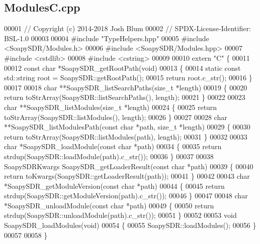 \subsection{Modules\+C.\+cpp}
\label{ModulesC_8cpp_source}

\begin{DoxyCode}
00001 \textcolor{comment}{// Copyright (c) 2014-2018 Josh Blum}
00002 \textcolor{comment}{// SPDX-License-Identifier: BSL-1.0}
00003 
00004 \textcolor{preprocessor}{#include "TypeHelpers.hpp"}
00005 \textcolor{preprocessor}{#include <SoapySDR/Modules.h>}
00006 \textcolor{preprocessor}{#include <SoapySDR/Modules.hpp>}
00007 \textcolor{preprocessor}{#include <cstdlib>}
00008 \textcolor{preprocessor}{#include <cstring>}
00009 
00010 \textcolor{keyword}{extern} \textcolor{stringliteral}{"C"} \{
00011 
00012 \textcolor{keyword}{const} \textcolor{keywordtype}{char} *SoapySDR_getRootPath(\textcolor{keywordtype}{void})
00013 \{
00014     \textcolor{keyword}{static} \textcolor{keyword}{const} std::string root = SoapySDR::getRootPath();
00015     \textcolor{keywordflow}{return} root.c\_str();
00016 \}
00017 
00018 \textcolor{keywordtype}{char} **SoapySDR_listSearchPaths(\textcolor{keywordtype}{size\_t} *length)
00019 \{
00020     \textcolor{keywordflow}{return} toStrArray(SoapySDR::listSearchPaths(), length);
00021 \}
00022 
00023 \textcolor{keywordtype}{char} **SoapySDR_listModules(\textcolor{keywordtype}{size\_t} *length)
00024 \{
00025     \textcolor{keywordflow}{return} toStrArray(SoapySDR::listModules(), length);
00026 \}
00027 
00028 \textcolor{keywordtype}{char} **SoapySDR_listModulesPath(\textcolor{keyword}{const} \textcolor{keywordtype}{char} *path, \textcolor{keywordtype}{size\_t} *length)
00029 \{
00030     \textcolor{keywordflow}{return} toStrArray(SoapySDR::listModules(path), length);
00031 \}
00032 
00033 \textcolor{keywordtype}{char} *SoapySDR_loadModule(\textcolor{keyword}{const} \textcolor{keywordtype}{char} *path)
00034 \{
00035     \textcolor{keywordflow}{return} strdup(SoapySDR::loadModule(path).c\_str());
00036 \}
00037 
00038 SoapySDRKwargs SoapySDR_getLoaderResult(\textcolor{keyword}{const} \textcolor{keywordtype}{char} *path)
00039 \{
00040     \textcolor{keywordflow}{return} toKwargs(SoapySDR::getLoaderResult(path));
00041 \}
00042 
00043 \textcolor{keywordtype}{char} *SoapySDR_getModuleVersion(\textcolor{keyword}{const} \textcolor{keywordtype}{char} *path)
00044 \{
00045     \textcolor{keywordflow}{return} strdup(SoapySDR::getModuleVersion(path).c\_str());
00046 \}
00047 
00048 \textcolor{keywordtype}{char} *SoapySDR_unloadModule(\textcolor{keyword}{const} \textcolor{keywordtype}{char} *path)
00049 \{
00050     \textcolor{keywordflow}{return} strdup(SoapySDR::unloadModule(path).c\_str());
00051 \}
00052 
00053 \textcolor{keywordtype}{void} SoapySDR_loadModules(\textcolor{keywordtype}{void})
00054 \{
00055     SoapySDR::loadModules();
00056 \}
00057 
00058 \}
\end{DoxyCode}
